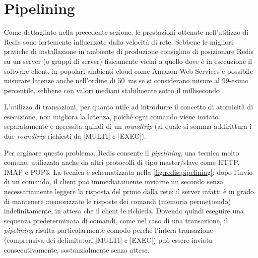 \section{Pipelining}

Come dettagliato nella precedente sezione, le prestazioni ottenute nell'utilizzo di Redis sono
fortemente influenzate dalla velocità di rete. Sebbene le migliori pratiche di installazione in
ambiente di produzione consiglino di posizionare Redis su un server (o gruppi di server) fisicamente
vicini a quello dove è in esecuzione il software client, in popolari ambienti cloud come Amazon
Web Services è possibile misurare latenze anche nell'ordine di \SI{50}{\milli\second} se si
considerano misure al 99-esimo percentile, sebbene con valori mediani stabilmente sotto il
millisecondo \cite{aws-latency}.

L'utilizzo di transazioni, per quanto utile ad introdurre il concetto di atomicità di esecuzione, non
migliora la latenza, poiché ogni comando viene inviato separatamente e necessita quindi di un
\emph{roundtrip} (al quale si somma addirittura i due \emph{roundtrip} richiesti da \cverb|MULTI| e
\cverb|EXEC|).

Per arginare questo problema, Redis consente il \emph{pipelining}, una tecnica molto comune,
utilizzata anche da altri protocolli di tipo ma\-ster/\-slave come HTTP, IMAP e POP3. La tecnica è
schematizzata nella \autoref{fig:redis:pipelining}: dopo l'invio di un comando, il client può
immediatamente inviarne un secondo senza necessariamente leggere la risposta del primo dalla rete;
il server infatti è in grado di mantenere memorizzate le risposte dei comandi (memoria permettendo)
indefinitamente, in attesa che il client le richieda. Dovendo quindi eseguire una sequenza
predeterminata di comandi, come nel caso di una transazione, il \emph{pipelining} risulta
particolarmente comodo perché l'intera transazione (comprensiva dei delimitatori \cverb|MULTI| e
\cverb|EXEC|) può essere inviata consecutivamente, sostanzialmente senza attese.


